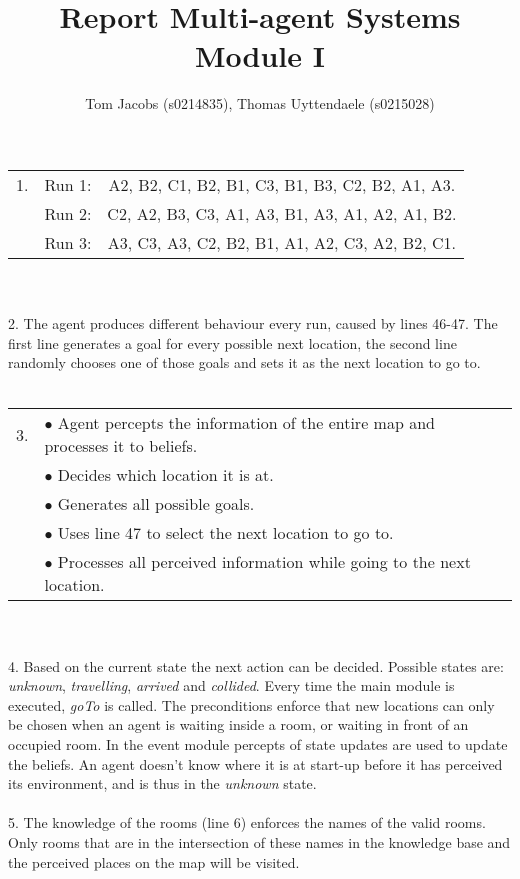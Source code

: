 \documentclass[10pt,a4paper]{article}
\title{Report Multi-agent Systems Module I}
\author{Tom Jacobs (s0214835), Thomas Uyttendaele (s0215028)}
\begin{document}
\maketitle
\part{}
\begin{tabular}{ l c | c }
1.& Run 1: & A2, B2, C1, B2, B1, C3, B1, B3, C2, B2, A1, A3.\\
 & Run 2: & C2, A2, B3, C3, A1, A3, B1, A3, A1, A2, A1, B2.\\
 & Run 3: & A3, C3, A3, C2, B2, B1, A1, A2, C3, A2, B2, C1.
\end{tabular}\\\\
\hphantom{1}2. The agent produces different behaviour every run, caused by lines 46-47.
The first line generates a goal for every possible next location, the second line randomly chooses one of those goals and sets it as the next location to go to.\\\\
\begin{tabular}{ l l }
3. & $\bullet$ Agent percepts the information of the entire map and processes it to beliefs.\\
 & $\bullet$ Decides which location it is at.\\
 & $\bullet$ Generates all possible goals.\\
 & $\bullet$ Uses line 47 to select the next location to go to.\\
 & $\bullet$ Processes all perceived information while going to the next location.
\end{tabular}\\\\
\hphantom{1}4. Based on the current state the next action can be decided. Possible states are: \emph{unknown}, \emph{travelling}, \emph{arrived} and \emph{collided}.
Every time the main module is executed, \emph{goTo} is called. The preconditions enforce that new locations can only be chosen when an agent is waiting inside a room, or waiting in front of an occupied room.
In the event module percepts of state updates are used to update the beliefs.
An agent doesn't know where it is at start-up before it has perceived its environment, and is thus in the \emph{unknown} state.\\
\\
\hphantom{1}5. The knowledge of the rooms (line 6) enforces the names of the valid rooms. 
Only rooms that are in the intersection of these names in the knowledge base and the perceived places on the map will be visited.
\end{document}

